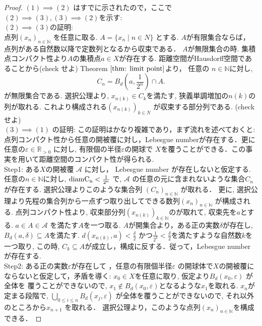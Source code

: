 \documentclass[lualatex]{ltjsbook}
\theoremstyle{remark}
\theoremstyle{plain}
\begin{document}
\begin{proof}
	$(1) \implies (2)$ はすでに示されたので，ここで$(2) \implies (3) , (3) \implies (2)$を示す:\\
	$(2) \implies (3)$の証明:\\
	点列$(x_n)_{n \in \mathbb{N}}$ を任意に取る. $A = \{x_n  \mid n \in N\} $ とする.
	 $A$が有限集合ならば， 点列がある自然数以降で定数列となるから収束である．
	  $A$が無限集合の時.  集積点コンパクト性より$A$の集積点$a \in X$が存在する.
	  距離空間がHausdorff空間であることから(check せよ)
	  Theorem $\ref{thm: limit point}$より， 任意の $n \in \mathbb{N}$に対し,
	  \[
	 C_n =  B_d(a, \frac{1}{2^{n}}) \cap A
	  .\] 
	  が無限集合である. 選択公理より,  $x_{n(k)} \in C_k$を満たす, 狭義単調増加の$n(k)$の列が取れる.
	  これより構成される$(x_{n(k)})_{k \in N}$ が収束する部分列である. (check せよ)\\
	  $(3) \implies (1) $ の証明: この証明はかなり複雑であり，まず流れを述べておくと:
	  点列コンパクト性から任意の開被覆に対し，Lebesgue numberが存在する．更に任意の$\varepsilon \in \mathbb{R}_{>0}$ に対し, 有限個の半径$\varepsilon$の開球で $X$を覆うことができる．この事実を用いて距離空間のコンパクト性が得られる.\\
	Step1: ある$X$の開被覆 $\mathcal{A}$ に対し，
	Lebesgue number が存在しないと仮定する. 
	任意の$n \in \mathbb{N}$に対し, 
	$\rm{diam}C_n<\frac{1}{2^{n}}$ で,
	$\mathcal{A}$ の任意の元に含まれないような集合$C_n$が存在する.  
	選択公理よりこのような集合列 $(C_n)_{n \in \mathbb{N}}$ が取れる．
	更に, 選択公理より先程の集合列から一点ずつ取り出してできる数列$(x_n)_{n \in \mathbb{N}}$ が構成される.
	点列コンパクト性より, 
	収束部分列$\left( x_{n(k)} \right) _{k \in \mathbb{N}}$のが取れて, 
	収束先を$a$とする.  
	$a \in A \in \mathcal{A} $ を満たす$A$を一つ取る.  
	$A$が開集合より，ある正の実数$\delta$が存在し,  $B_d (a, \delta) \subseteq A$を満たす. 
	$d(x_{n(k)},a)< \frac{\delta}{2}$ かつ$\frac{1}{2^{k} } < \frac{\delta}{2}$を満たすような自然数$k$を一つ取り, 
	この時,  $C_k \subseteq A$が成立し，構成に反する．従って，Lebesgue number が存在する.\\
	Step2: ある正の実数$\varepsilon$が存在して ，任意の有限個半径$\varepsilon$ の開球体で$X$の開被覆にならないと仮定して，矛盾を導く: 
	$x_0 \in X$を任意に取り, 仮定より$B_d\left( x_0 , \varepsilon \right) $ が全体を
	覆うことができないので, $x_1 \not\in  B_d(x_0 ,\varepsilon)$となるような$x_1$を取れる.
	 $x_n$が定まる段階で,  $\bigcup_{0 \le i \le n} B_d(x_j,\varepsilon)$ が全体を覆うことができないので, それ以外のところから$x_{n+1}$ を取れる．
	 選択公理より，このような点列$\left( x_n \right) _{n \in  \mathbb{N}}$を構成できる．

\end{proof}
\end{document}
